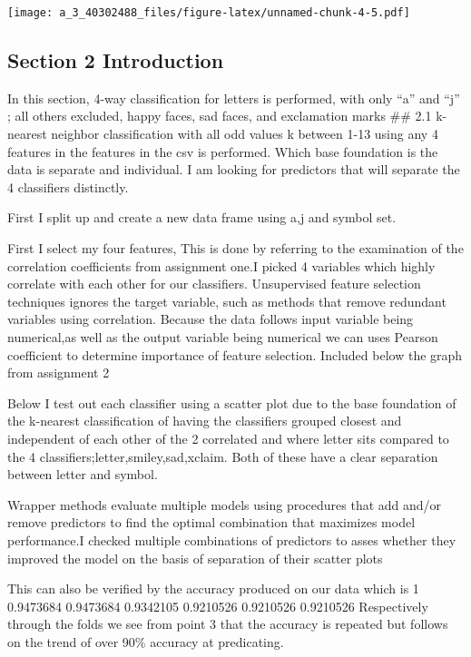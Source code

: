\documentclass[
]{article}
\begin{document}
\texttt{[image: a\_3\_40302488\_files/figure-latex/unnamed-chunk-4-5.pdf]}

\hypertarget{section-2-introduction}{%
\subsection{Section 2 Introduction}\label{section-2-introduction}}

In this section, 4-way classification for letters is performed, with
only ``a'' and ``j'' ; all others excluded, happy faces, sad faces, and
exclamation marks \#\# 2.1 k-nearest neighbor classification with all
odd values k between 1-13 using any 4 features in the features in the
csv is performed. Which base foundation is the data is separate and
individual. I am looking for predictors that will separate the 4
classifiers distinctly.

First I split up and create a new data frame using a,j and symbol set.

First I select my four features, This is done by referring to the
examination of the correlation coefficients from assignment one.I picked
4 variables which highly correlate with each other for our classifiers.
Unsupervised feature selection techniques ignores the target variable,
such as methods that remove redundant variables using correlation.
Because the data follows input variable being numerical,as well as the
output variable being numerical we can uses Pearson coefficient to
determine importance of feature selection. Included below the graph from
assignment 2

Below I test out each classifier using a scatter plot due to the base
foundation of the k-nearest classification of having the classifiers
grouped closest and independent of each other of the 2 correlated and
where letter sits compared to the 4
classifiers;letter,smiley,sad,xclaim. Both of these have a clear
separation between letter and symbol.

Wrapper methods evaluate multiple models using procedures that add
and/or remove predictors to find the optimal combination that maximizes
model performance.I checked multiple combinations of predictors to asses
whether they improved the model on the basis of separation of their
scatter plots

This can also be verified by the accuracy produced on our data which is
1 0.9473684 0.9473684 0.9342105 0.9210526 0.9210526 0.9210526
Respectively through the folds we see from point 3 that the accuracy is
repeated but follows on the trend of over 90\% accuracy at predicating.
\end{document}
